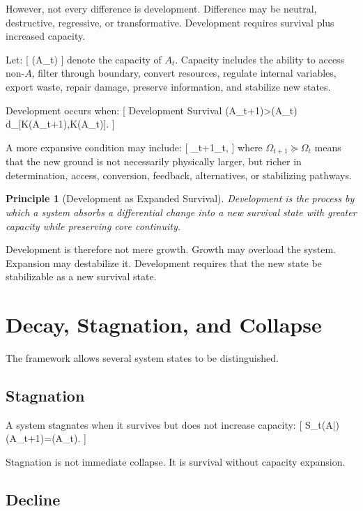 \documentclass[11pt,a4paper]{article}
\newtheorem{principle}{Principle}
\newcommand{\Cap}{\operatorname{Cap}}
\begin{document}
However, not every difference is development. Difference may be neutral, destructive, regressive, or transformative. Development requires survival plus increased capacity.

Let:
[
\Cap(A_t)
]
denote the capacity of $A_t$. Capacity includes the ability to access non-$A$, filter through boundary, convert resources, regulate internal variables, export waste, repair damage, preserve information, and stabilize new states.

Development occurs when:
[
Development
\Longleftrightarrow
Survival
\wedge
\Cap(A_{t+1})>\Cap(A_t)
\wedge
d_{\Omega}[K(A_{t+1}),K(A_t)]\leq\theta.
]

A more expansive condition may include:
[
\Omega_{t+1}\succeq\Omega_t,
]
where $\Omega_{t+1}\succeq\Omega_t$ means that the new ground is not necessarily physically larger, but richer in determination, access, conversion, feedback, alternatives, or stabilizing pathways.

\begin{principle}[Development as Expanded Survival]
Development is the process by which a system absorbs a differential change into a new survival state with greater capacity while preserving core continuity.
\end{principle}

Development is therefore not mere growth. Growth may overload the system. Expansion may destabilize it. Development requires that the new state be stabilizable as a new survival state.

\section{Decay, Stagnation, and Collapse}

The framework allows several system states to be distinguished.

\subsection{Stagnation}

A system stagnates when it survives but does not increase capacity:
[
S_t(A|\Omega)
\wedge
\Cap(A_{t+1})=\Cap(A_t).
]

Stagnation is not immediate collapse. It is survival without capacity expansion.

\subsection{Decline}
\end{document}
